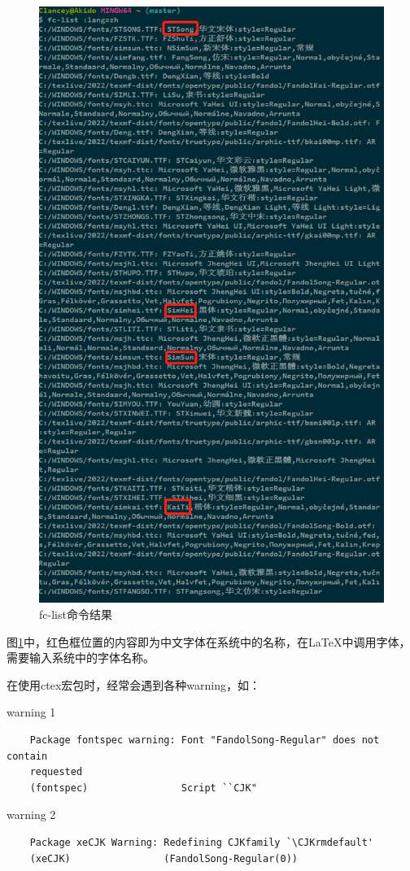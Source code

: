 \documentclass[12pt]{book}
\begin{document}
\begin{figure}[htbp]
    \centering
    \includegraphics[width=0.8\linewidth]{lang=zh.jpg}
    \caption{fc-list命令结果}
    \label{fc-list}
\end{figure}

图\ref{fc-list}中，红色框位置的内容即为中文字体在系统中的名称，在\LaTeX{}中调用字体，需要输入系统中的字体名称。

在使用ctex宏包时，经常会遇到各种warning，如：

warning 1
\begin{verbatim}
    Package fontspec warning: Font "FandolSong-Regular" does not contain
    requested 
    (fontspec)                Script ``CJK"
\end{verbatim}

warning 2
\begin{verbatim}
    Package xeCJK Warning: Redefining CJKfamily `\CJKrmdefault'
    (xeCJK)                (FandolSong-Regular(0))
\end{verbatim}
\end{document}
